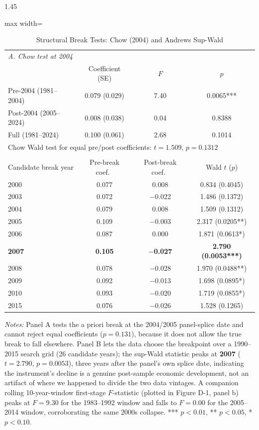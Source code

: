 \documentclass[12pt]{article}
\begin{document}
\begin{bibunit}[jpe]
\begin{spacing}{1.45}
\begin{table}[H]
\centering
\begin{adjustbox}{max width=\textwidth}
\begin{threeparttable}
\caption{Structural Break Tests: Chow (2004) and Andrews Sup-Wald}
\label{tab:D4}
\begin{tabular}{lccc}
\toprule
\multicolumn{4}{l}{\textit{A. Chow test at 2004}} \\
 & Coefficient (SE) & $F$ & $p$ \\
\midrule
Pre-2004 (1981--2004)  & 0.079 (0.029) & 7.40 & 0.0065*** \\
Post-2004 (2005--2024) & 0.008 (0.038) & 0.04 & 0.8388 \\
Full (1981--2024)      & 0.100 (0.061) & 2.68 & 0.1014 \\
\multicolumn{4}{l}{Chow Wald test for equal pre/post coefficients: $t=1.509$, $p=0.1312$} \\
\addlinespace
\multicolumn{4}{l}{\textit{B. Andrews sup-Wald test (breakpoint search, selected years)}} \\
Candidate break year & Pre-break coef.\ & Post-break coef.\ & Wald $t$ ($p$) \\
\midrule
2000 & 0.077 & 0.008  & 0.834 (0.4045) \\
2003 & 0.072 & $-$0.022 & 1.486 (0.1372) \\
2004 & 0.079 & 0.008  & 1.509 (0.1312) \\
2005 & 0.109 & $-$0.003 & 2.317 (0.0205**) \\
2006 & 0.087 & 0.000  & 1.871 (0.0613*) \\
\textbf{2007} & \textbf{0.105} & \textbf{$-$0.027} & \textbf{2.790 (0.0053***)} \\
2008 & 0.078 & $-$0.028 & 1.970 (0.0488**) \\
2009 & 0.092 & $-$0.013 & 1.698 (0.0895*) \\
2010 & 0.093 & $-$0.020 & 1.719 (0.0855*) \\
2015 & 0.076 & $-$0.026 & 1.528 (0.1265) \\
\bottomrule
\end{tabular}
\begin{tablenotes}[flushleft]
\footnotesize
\item \textit{Notes:} Panel A tests the a priori break at the 2004/2005 panel-splice date and cannot reject equal coefficients ($p=0.131$), because it does not allow the true break to fall elsewhere. Panel B lets the data choose the breakpoint over a 1990--2015 search grid (26 candidate years); the sup-Wald statistic peaks at \textbf{2007} ($t=2.790$, $p=0.0053$), three years after the panel's own splice date, indicating the instrument's decline is a genuine post-sample economic development, not an artifact of where we happened to divide the two data vintages. A companion rolling 10-year-window first-stage $F$-statistic (plotted in Figure D-1, panel b) peaks at $F=9.30$ for the 1983--1992 window and falls to $F=0.00$ for the 2005--2014 window, corroborating the same 2000s collapse. *** $p<0.01$, ** $p<0.05$, * $p<0.10$.

\end{tablenotes}
\end{threeparttable}
\end{adjustbox}
\end{table}
\end{spacing}
\end{bibunit}
\end{document}

